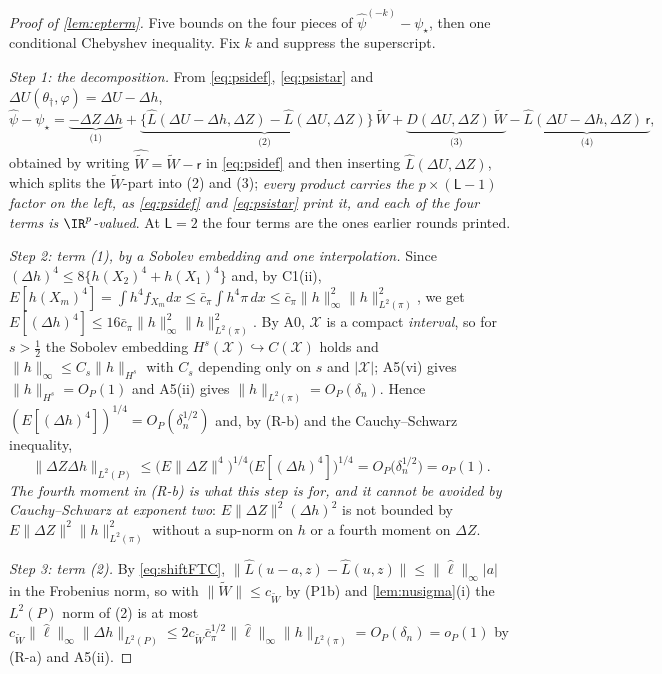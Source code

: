\begin{proof}[Proof of \cref{lem:epterm}]
Five bounds on the four pieces of $\hat\psi^{(-k)}-\psi_\star$, then one conditional Chebyshev inequality.
Fix $k$ and suppress the superscript.

\emph{Step 1: the decomposition.} From \eqref{eq:psidef}, \eqref{eq:psistar} and
$\Delta U(\theta_\dagger,\hat\varphi)=\Delta U-\Delta h$,
\[
\hat\psi-\psi_\star=\underbrace{-\Delta Z\,\Delta h}_{\text{(1)}}
+\underbrace{\big\{\hat L(\Delta U-\Delta h,\Delta Z)-\hat L(\Delta U,\Delta Z)\big\}\,\widetilde W}_{\text{(2)}}
+\underbrace{D(\Delta U,\Delta Z)\,\widetilde W}_{\text{(3)}}
-\underbrace{\hat L(\Delta U-\Delta h,\Delta Z)\,\mathsf r}_{\text{(4)}} ,
\]
obtained by writing $\widehat{\widetilde W}=\widetilde W-\mathsf r$ in \eqref{eq:psidef} and then inserting
$\hat L(\Delta U,\Delta Z)$, which splits the $\widetilde W$-part into (2) and (3); \emph{every product carries the
$p\times(\mathsf L-1)$ factor on the left, as \eqref{eq:psidef} and \eqref{eq:psistar} print it, and each
of the four terms is $\IR^{p}$-valued}. At $\mathsf L=2$ the four terms are the ones earlier rounds
printed.

\emph{Step 2: term \textup{(1)}, by a Sobolev embedding and one interpolation.} Since
$(\Delta h)^{4}\le8\{h(X_2)^{4}+h(X_1)^{4}\}$ and, by C1(ii),
$E[h(X_m)^{4}]=\int h^{4}f_{X_m}dx\le\bar c_\pi\int h^{4}\pi\,dx\le\bar c_\pi\|h\|^{2}_\infty\|h\|^{2}_{L^{2}(\pi)}$,
we get $E[(\Delta h)^{4}]\le16\bar c_\pi\|h\|^{2}_\infty\|h\|^{2}_{L^{2}(\pi)}$. By A0, $\mathcal X$ is a
compact \emph{interval}, so for $s>\tfrac12$ the Sobolev embedding $H^{s}(\mathcal X)\hookrightarrow C(\mathcal X)$
holds and $\|h\|_\infty\le C_{s}\|h\|_{H^{s}}$ with $C_{s}$ depending only on $s$ and $|\mathcal X|$; A5(vi)
gives $\|h\|_{H^{s}}=O_P(1)$ and A5(ii) gives $\|h\|_{L^{2}(\pi)}=O_P(\delta_n)$. Hence
$(E[(\Delta h)^{4}])^{1/4}=O_P(\delta_n^{1/2})$ and, by (R-b) and the Cauchy--Schwarz inequality,
\[
\big\|\Delta Z\Delta h\big\|_{L^{2}(P)}\le\big(E\|\Delta Z\|^{4}\big)^{1/4}\big(E[(\Delta h)^{4}]\big)^{1/4}
=O_P\big(\delta_n^{1/2}\big)=o_P(1).
\]
\emph{The fourth moment in (R-b) is what this step is for, and it cannot be avoided by Cauchy--Schwarz at
exponent two}: $E\|\Delta Z\|^{2}(\Delta h)^{2}$ is not bounded by $E\|\Delta Z\|^{2}\|h\|^{2}_{L^{2}(\pi)}$
without a sup-norm on $h$ or a fourth moment on $\Delta Z$.

\emph{Step 3: term \textup{(2)}.} By \eqref{eq:shiftFTC},
$\|\hat L(u-a,z)-\hat L(u,z)\|\le\|\hat\ell\|_\infty|a|$ in the Frobenius norm, so with
$\|\widetilde W\|\le c_{\widetilde W}$ by \textup{(P1b)} and
\cref{lem:nusigma}(i) the $L^{2}(P)$ norm of (2) is at most
$c_{\widetilde W}\|\hat\ell\|_\infty\|\Delta h\|_{L^{2}(P)}\le2c_{\widetilde W}\bar c_\pi^{1/2}\|\hat\ell\|_\infty\|h\|_{L^{2}(\pi)}=O_P(\delta_n)=o_P(1)$
by (R-a) and A5(ii).


\end{proof}
